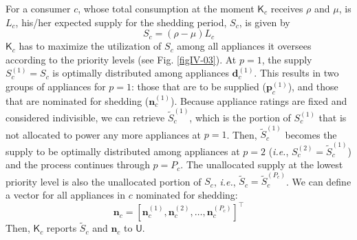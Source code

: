 \documentclass[conference, a4paper]{IEEEtran}
\begin{document}
For a consumer $c$, whose total consumption at the moment $\mathsf{K}_{c}$ receives $\rho$ and $\mu$, is $L_{c}$,
his/her expected supply for the shedding period, $S_{c}$, is given by
\begin{equation}
	S_{c} = \left( \rho - \mu \right) L_{c}
	\label{eqn30}
\end{equation}
$\mathsf{K}_{c}$ has to maximize the utilization of $S_{c}$ among all appliances it oversees
according to the priority levels (see Fig. \ref{figIV-03}).
At $p=1$, the supply $S_{c}^{\left(1\right)} = S_{c}$ is optimally distributed among appliances $\mathbf{d}_{c}^{\left(1\right)}$.
This results in two groups of appliances for $p=1$:
those that are to be supplied ($\mathbf{p}_{c}^{\left(1\right)}$),
and those that are nominated for shedding ($\mathbf{n}_{c}^{\left(1\right)}$).
Because appliance ratings are fixed and considered indivisible, we can retrieve $\tilde{S}_{c}^{\left(1\right)}$,
which is the portion of $S_{c}^{\left(1\right)}$ that is not allocated to power any more appliances at $p=1$.
Then, $\tilde{S}_{c}^{\left(1\right)}$ becomes the supply to be optimally distributed among appliances at $p=2$
(\textit{i.e.},
$S_{c}^{\left(2\right)} = \tilde{S}_{c}^{\left(1\right)}$)
and the process continues through $p=P_{c}$.
The unallocated supply at the lowest priority level is also the unallocated portion of $S_{c}$,
\textit{i.e.}, $\tilde{S}_{c} = \tilde{S}_{c}^{\left(P_{c}\right)}$.
We can define a vector for all appliances in $c$ nominated for shedding:
\begin{equation}
	\mathbf{n}_{c} = \left[ \mathbf{n}_{c}^{\left(1\right)}, \mathbf{n}_{c}^{\left(2\right)}, \ldots, \mathbf{n}_{c}^{\left(P_{c}\right)} \right]^{\intercal}
	\label{eqn31}
\end{equation}
Then, $\mathsf{K}_{c}$ reports $\tilde{S}_{c}$ and $\mathbf{n}_{c}$ to $\mathsf{U}$.
\end{document}

